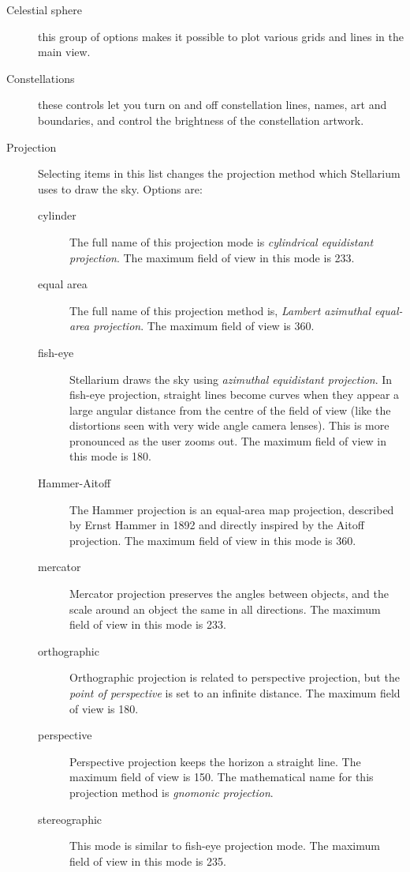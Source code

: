 \begin{description}
\item[Celestial sphere] this group of options makes it possible to
  plot various grids and lines in the main view.
\item[Constellations] these controls let you turn on and off
  constellation lines, names, art and boundaries, and control the
  brightness of the constellation artwork.
\item[Projection] Selecting items in this list changes the
  projection method which Stellarium uses to draw the sky. Options are:

  \begin{description}
  \item[cylinder] The full name of this projection mode is
    \emph{cylindrical equidistant projection}. The maximum field of view
    in this mode is 233\degree.
  \item[equal area] The full name of this projection method is,
    \emph{Lambert azimuthal equal-area projection}. The maximum field of
    view is 360\degree.
  \item[fish-eye] Stellarium draws the sky using \emph{azimuthal
    equidistant projection}. In fish-eye projection, straight lines
    become curves when they appear a large angular distance from the
    centre of the field of view (like the distortions seen with very
    wide angle camera lenses). This is more pronounced as the user zooms
    out. The maximum field of view in this mode is 180\degree.
  \item[Hammer-Aitoff] The Hammer projection is an equal-area map
    projection, described by Ernst Hammer in 1892 and directly inspired
    by the Aitoff projection. The maximum field of view in this mode is
    360\degree.
  \item[mercator] Mercator projection preserves the angles between
    objects, and the scale around an object the same in all directions.
    The maximum field of view in this mode is 233\degree.
  \item[orthographic] Orthographic projection is related to
    perspective projection, but the \emph{point of perspective} is set
    to an infinite distance. The maximum field of view is 180\degree.
  \item[perspective] Perspective projection keeps the horizon a
    straight line. The maximum field of view is 150\degree. The mathematical
    name for this projection method is \emph{gnomonic projection}.
  \item[stereographic] This mode is similar to fish-eye projection
    mode. The maximum field of view in this mode is 235\degree.
  \end{description}
\end{description}

